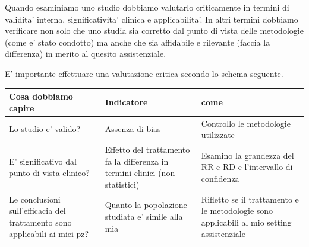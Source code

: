 \documentclass[]{book}
\begin{document}
Quando esaminiamo uno studio dobbiamo valutarlo criticamente in termini di validita' interna, significativita' clinica e applicabilita'. In altri termini dobbiamo verificare non solo che uno studia sia corretto dal punto di vista delle metodologie (come e' stato condotto) ma anche che sia affidabile e rilevante (faccia la differenza) in merito al quesito assistenziale.

E' importante effettuare una valutazione critica secondo lo schema seguente.

\begin{longtable}[]{@{}lll@{}}
\toprule
\begin{minipage}[b]{0.30\columnwidth}\raggedright
Cosa dobbiamo capire\strut
\end{minipage} & \begin{minipage}[b]{0.30\columnwidth}\raggedright
Indicatore\strut
\end{minipage} & \begin{minipage}[b]{0.30\columnwidth}\raggedright
come\strut
\end{minipage}\tabularnewline
\midrule
\endhead
\begin{minipage}[t]{0.30\columnwidth}\raggedright
Lo studio e' valido?\strut
\end{minipage} & \begin{minipage}[t]{0.30\columnwidth}\raggedright
Assenza di bias\strut
\end{minipage} & \begin{minipage}[t]{0.30\columnwidth}\raggedright
Controllo le metodologie utilizzate\strut
\end{minipage}\tabularnewline
\begin{minipage}[t]{0.30\columnwidth}\raggedright
E' significativo dal punto di vista clinico?\strut
\end{minipage} & \begin{minipage}[t]{0.30\columnwidth}\raggedright
Effetto del trattamento fa la differenza in termini clinici (non statistici)\strut
\end{minipage} & \begin{minipage}[t]{0.30\columnwidth}\raggedright
Esamino la grandezza del RR e RD e l'intervallo di confidenza\strut
\end{minipage}\tabularnewline
\begin{minipage}[t]{0.30\columnwidth}\raggedright
Le conclusioni sull'efficacia del trattamento sono applicabili ai miei pz?\strut
\end{minipage} & \begin{minipage}[t]{0.30\columnwidth}\raggedright
Quanto la popolazione studiata e' simile alla mia\strut
\end{minipage} & \begin{minipage}[t]{0.30\columnwidth}\raggedright
Rifletto se il trattamento e le metodologie sono applicabili al mio setting assistenziale\strut
\end{minipage}\tabularnewline
\bottomrule
\end{longtable}
\end{document}
